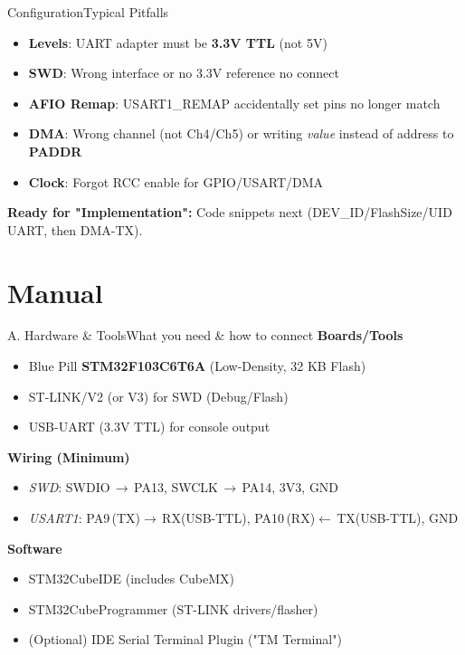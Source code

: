 \documentclass{beamer}
\begin{document}
\begin{frame}{Configuration}{Typical Pitfalls}
	\begin{itemize}
		\item \textbf{Levels}: UART adapter must be \textbf{3.3V TTL} (not 5V)
		\item \textbf{SWD}: Wrong interface or no 3.3V reference \textrightarrow{} no connect
		\item \textbf{AFIO Remap}: USART1\_REMAP accidentally set \textrightarrow{} pins no longer match
		\item \textbf{DMA}: Wrong channel (not Ch4/Ch5) or writing \textit{value} instead of address to \textbf{PADDR}
		\item \textbf{Clock}: Forgot RCC enable for GPIO/USART/DMA
	\end{itemize}
	
	\medskip
	\textbf{Ready for "Implementation":} Code snippets next (DEV\_ID/FlashSize/UID \textrightarrow{} UART, then DMA-TX).
\end{frame}
\section{Manual}

\begin{frame}{A. Hardware \& Tools}{What you need \& how to connect}
	\textbf{Boards/Tools}
	\begin{itemize}
		\item Blue Pill \textbf{STM32F103C6T6A} (Low-Density, 32 KB Flash)
		\item ST-LINK/V2 (or V3) for SWD (Debug/Flash)
		\item USB-UART (3.3V TTL) for console output
	\end{itemize}
	
	\medskip
	\textbf{Wiring (Minimum)}
	\begin{itemize}
		\item \textit{SWD}: SWDIO\,$\rightarrow$\,PA13, SWCLK\,$\rightarrow$\,PA14, 3V3, GND
		\item \textit{USART1}: PA9\,(TX)$\rightarrow$\,RX(USB-TTL), PA10\,(RX)$\leftarrow$\,TX(USB-TTL), GND
	\end{itemize}
	
	\medskip
	\textbf{Software}
	\begin{itemize}
		\item STM32CubeIDE (includes CubeMX)
		\item STM32CubeProgrammer (ST-LINK drivers/flasher)
		\item (Optional) IDE Serial Terminal Plugin ("TM Terminal")
	\end{itemize}
\end{frame}
\end{document}
